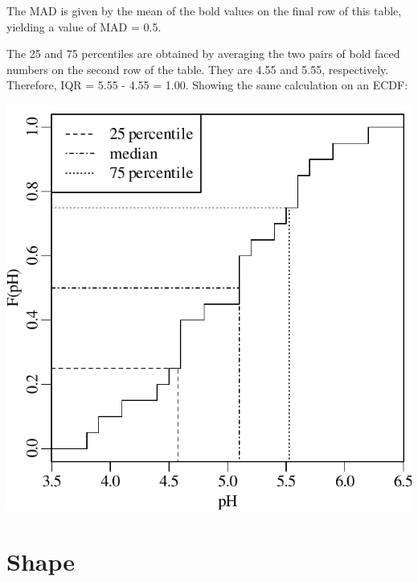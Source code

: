 The MAD is given by the mean of the bold values on the final row of
this table, yielding a value of MAD = 0.5.\medskip

The 25 and 75 percentiles are obtained by averaging the two pairs of
bold faced numbers on the second row of the table. They are 4.55 and
5.55, respectively. Therefore, IQR = 5.55 - 4.55 = 1.00. Showing the
same calculation on an ECDF:

\noindent\begin{minipage}[t][][b]{.4\textwidth}
\includegraphics[width=\textwidth]{../figures/IQRpH.pdf}
\end{minipage}
\begin{minipage}[t][][t]{.6\textwidth}
\end{minipage}

\section{Shape}
\label{sec:shape}

